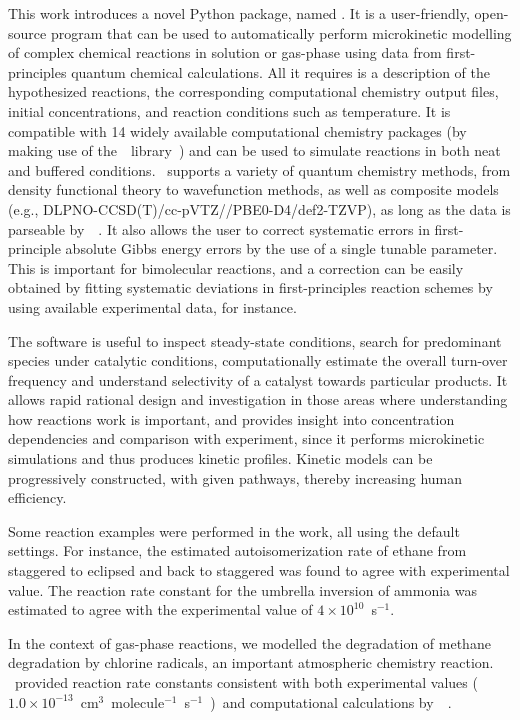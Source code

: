 This work introduces a novel Python package,
named \overreact{}.
It is a user-friendly,
open-source program that can be used
to automatically perform microkinetic modelling of complex chemical reactions in solution or gas-phase
using data from first-principles quantum chemical calculations.
All it requires is a description of the hypothesized reactions,
the corresponding computational chemistry output files,
initial concentrations,
and reaction conditions such as temperature.
It is compatible with 14 widely available computational chemistry packages
(by making use of the~\cclib{}~library~\cite{O_boyle_2008})
and can be used to simulate reactions in both neat and buffered conditions.
\overreact{}~supports a variety of quantum chemistry methods,
from density functional theory to wavefunction methods,
as well as composite models (e.g.,
DLPNO-CCSD(T)/cc-pVTZ//PBE0-D4/def2-TZVP),
as long as the data is parseable by~\cclib{}~\cite{O_boyle_2008}.
It also allows the user to correct systematic errors in first-principle absolute Gibbs energy errors
by the use of a single tunable parameter.
This is important for bimolecular reactions,
and a correction can be easily obtained by fitting systematic deviations
in first-principles reaction schemes by using available experimental data,
for instance.

The software is useful to inspect steady-state conditions,
search for predominant species under catalytic conditions,
computationally estimate the overall turn-over frequency and understand selectivity of a catalyst towards particular products.
It allows rapid rational design and investigation in those areas where understanding how reactions work is important,
and provides insight into concentration dependencies and comparison with experiment,
since it performs microkinetic simulations
and thus produces kinetic profiles.
Kinetic models can be progressively constructed,
with given pathways,
thereby increasing human efficiency.

Some reaction examples were performed in the work,
all using the default settings.
For instance,
the estimated autoisomerization rate of ethane from staggered to eclipsed
and back to staggered was found to agree with experimental value.
The reaction rate constant for the umbrella inversion of ammonia was estimated to agree
with the experimental value of $4 \times 10^{10}$~s$^{-1}$.

In the context of gas-phase reactions,
we modelled the degradation of methane degradation by chlorine radicals,
an important atmospheric chemistry reaction.
\linebreak
\overreact{}~provided reaction rate constants consistent with both
experimental
values
($1.0 \times 10^{-13}$~cm$^3$~molecule$^{-1}$~s$^{-1}$~\cite{Burkholder_2020})~and computational calculations
by~\citeauthor{Tanaka_1996}~\cite{Tanaka_1996}.

